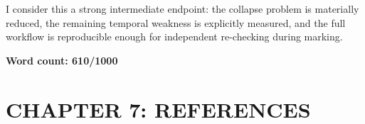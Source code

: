 \documentclass[12pt,letterpaper]{article}
\begin{document}
I consider this a strong intermediate endpoint: the collapse problem is materially reduced, the remaining temporal weakness is explicitly measured, and the full workflow is reproducible enough for independent re-checking during marking.

\textbf{Word count: 610/1000}

\clearpage
\setcounter{section}{7}
\setcounter{subsection}{0}
\section*{CHAPTER 7: REFERENCES}
\renewcommand{\refname}{}
\begingroup
\small


\endgroup
\end{document}
